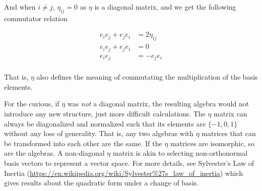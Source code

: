 \documentclass[8pt]{article}
\begin{document}
And when $i \neq j$, $\eta_{ij} = 0$ as $\eta$ is a diagonal matrix, and we get the following commutator relation

\begin{equation}
  \begin{aligned}
    e_i e_j + e_j e_i &= 2 \eta_{ij} \\
    e_i e_j + e_j e_i &= 0 \\
    e_i e_j &= - e_j e_i \\
  \end{aligned}
\end{equation}

That is, $\eta$ also defines the meaning of commutating the multiplication of the basis elements.

For the curious, if $\eta$ was \emph{not} a diagonal matrix, the resulting algebra would not introduce any new structure, just more difficult calculations. The $\eta$ matrix can always be diagonalized and normalized such that its elements are $\{-1,0,1\}$ without any loss of generality. That is, any two algebras with $\eta$ matrices that can be transformed into each other are the same. If the $\eta$ matrices are isomorphic, so are the algebras. A non-diagonal $\eta$ matrix is akin to selecting non-orthonormal basis vectors to represent a vector space. For more details, see Sylvester's Law of Inertia (\url{https://en.wikipedia.org/wiki/Sylvester%27s_law_of_inertia}) which gives results about the quadratic form under a change of basis.
\end{document}

